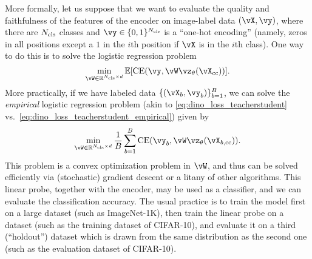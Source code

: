 \documentclass[../../book-main.tex]{subfiles}
\begin{document}
More formally, let us suppose that we want to evaluate the quality and faithfulness of the features of the encoder on image-label data \((\vX, \vy)\), where there are \(N_{\mathrm{cls}}\) classes and \(\vy \in \{0, 1\}^{N_{\cls}}\) is a ``one-hot encoding'' (namely, zeros in all positions except a \(1\) in the \(i\)th position if \(\vX\) is in the \(i\)th class). One way to do this is to solve the logistic regression problem 
\begin{equation}\label{eq:linear_probing}
    \min_{\vW \in \R^{N_{\cls} \times d}}\Ex[\CE(\vy, \vW \vz_{\theta}(\vX_{\cc}))].
\end{equation}
More practically, if we have labeled data \(\{(\vX_{b}, \vy_{b})\}_{b = 1}^{B}\), we can solve the \textit{empirical} logistic regression problem (akin to \eqref{eq:dino_loss_teacherstudent} vs.~\eqref{eq:dino_loss_teacherstudent_empirical}) given by 
\begin{equation}\label{eq:linear_probing_empirical}
    \min_{\vW \in \R^{N_{\cls} \times d}}\frac{1}{B}\sum_{b = 1}^{B}\CE(\vy_{b}, \vW \vz_{\theta}(\vX_{b, \cc})).
\end{equation}
This problem is a convex optimization problem in \(\vW\), and thus can be solved efficiently via (stochastic) gradient descent or a litany of other algorithms. This linear probe, together with the encoder, may be used as a classifier, and we can evaluate the classification accuracy. The usual practice is to train the model first on a large dataset (such as ImageNet-1K), then train the linear probe on a dataset (such as the training dataset of CIFAR-10), and evaluate it on a third (``holdout'') dataset which is drawn from the same distribution as the second one (such as the evaluation dataset of CIFAR-10).
\end{document}
